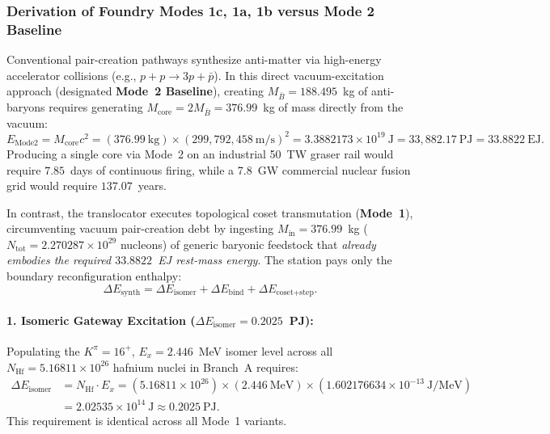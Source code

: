\documentclass[11pt,onecolumn]{article}
\begin{document}
\subsubsection{Derivation of Foundry Modes 1c, 1a, 1b versus Mode 2 Baseline}
Conventional pair-creation pathways synthesize anti-matter via high-energy accelerator collisions (e.g., $p + p \to 3p + \bar{p}$). In this direct vacuum-excitation approach (designated \textbf{Mode~2 Baseline}), creating $M_{\bar{B}} = 188.495$~kg of anti-baryons requires generating $M_{\text{core}} = 2M_{\bar{B}} = 376.99$~kg of mass directly from the vacuum:
\begin{equation}
E_{\text{Mode2}} = M_{\text{core}} c^2 = (376.99~\text{kg})\times (299{,}792{,}458~\text{m/s})^2 = 3.3882173\times 10^{19}~\text{J} = 33{,}882.17~\text{PJ} = 33.8822~\text{EJ}.
\label{eq:mode2_energy}
\end{equation}
Producing a single core via Mode~2 on an industrial 50~TW graser rail would require $7.85$~days of continuous firing, while a 7.8~GW commercial nuclear fusion grid would require $137.07$~years.

In contrast, the translocator executes topological coset transmutation (\textbf{Mode~1}), circumventing vacuum pair-creation debt by ingesting $M_{\text{in}} = 376.99$~kg ($N_{\text{tot}} = 2.270287\times 10^{29}$ nucleons) of generic baryonic feedstock that \emph{already embodies the required $33.8822$~EJ rest-mass energy}. The station pays only the boundary reconfiguration enthalpy:
\begin{equation}
\Delta E_{\text{synth}} = \Delta E_{\text{isomer}} + \Delta E_{\text{bind}} + \Delta E_{\text{coset+step}}.
\end{equation}

\paragraph{1. Isomeric Gateway Excitation ($\Delta E_{\text{isomer}} = 0.2025$~PJ):}
Populating the $K^\pi = 16^+$, $E_x = 2.446$~MeV isomer level across all $N_{\text{Hf}} = 5.16811\times 10^{26}$ hafnium nuclei in Branch~A requires:
\begin{equation}
\begin{split}
\Delta E_{\text{isomer}} &= N_{\text{Hf}} \cdot E_x = (5.16811\times 10^{26})\times (2.446~\text{MeV}) \times (1.602176634\times 10^{-13}~\text{J/MeV}) \\
&= 2.02535\times 10^{14}~\text{J} \approx 0.2025~\text{PJ}.
\end{split}
\label{eq:isomer_energy_calc}
\end{equation}
This requirement is identical across all Mode~1 variants.
\end{document}
